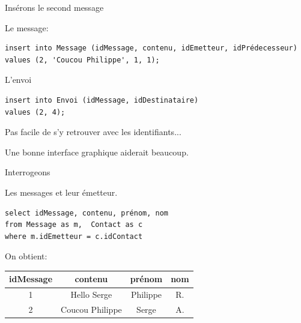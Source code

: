 \begin{frame}[fragile]{Insérons le second message}

Le message:

\begin{verbatim}
insert into Message (idMessage, contenu, idEmetteur, idPrédecesseur)
values (2, 'Coucou Philippe', 1, 1);
\end{verbatim}

\vfill

L'envoi

\vfill

\begin{verbatim}
insert into Envoi (idMessage, idDestinataire) 
values (2, 4);
\end{verbatim}

\vfill
Pas facile de s'y retrouver avec les identifiants... 

\vfill

\alert{Une bonne
interface graphique aiderait beaucoup}.
\end{frame}


\begin{frame}[fragile]{Interrogeons}

Les messages et leur émetteur.

\begin{verbatim}
select idMessage, contenu, prénom, nom
from Message as m,  Contact as c
where m.idEmetteur = c.idContact
\end{verbatim}

\vfill

On obtient:

\vfill

\begin{small}
\begin{tabular}{c|c|c|c}
\textbf{idMessage} & \textbf{contenu} & \textbf{prénom} & \textbf{nom}\\ \hline 
1 & Hello Serge & Philippe & R.\\ \hline 
2 & Coucou Philippe & Serge & A.\\ \hline 
\end{tabular}
\end{small}
\end{frame}


